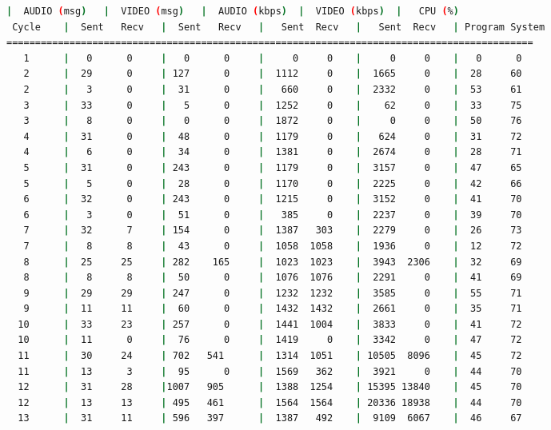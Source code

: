 \begin{adjustbox}{max width=\textwidth}
\begin{lstlisting}[language=bash,basicstyle=\ttfamily\scriptsize]
          |  AUDIO (msg)   |  VIDEO (msg)   |  AUDIO (kbps)  |  VIDEO (kbps)  |   CPU (%)
 Cycle    |  Sent   Recv   |  Sent   Recv   |   Sent  Recv   |   Sent  Recv   | Program System
============================================================================================
   1      |   0      0     |   0      0     |     0     0    |     0     0    |   0      0
   2      |  29      0     | 127      0     |  1112     0    |  1665     0    |  28     60
   2      |   3      0     |  31      0     |   660     0    |  2332     0    |  53     61
   3      |  33      0     |   5      0     |  1252     0    |    62     0    |  33     75
   3      |   8      0     |   0      0     |  1872     0    |     0     0    |  50     76
   4      |  31      0     |  48      0     |  1179     0    |   624     0    |  31     72
   4      |   6      0     |  34      0     |  1381     0    |  2674     0    |  28     71
   5      |  31      0     | 243      0     |  1179     0    |  3157     0    |  47     65
   5      |   5      0     |  28      0     |  1170     0    |  2225     0    |  42     66
   6      |  32      0     | 243      0     |  1215     0    |  3152     0    |  41     70
   6      |   3      0     |  51      0     |   385     0    |  2237     0    |  39     70
   7      |  32      7     | 154      0     |  1387   303    |  2279     0    |  26     73
   7      |   8      8     |  43      0     |  1058  1058    |  1936     0    |  12     72
   8      |  25     25     | 282    165     |  1023  1023    |  3943  2306    |  32     69
   8      |   8      8     |  50      0     |  1076  1076    |  2291     0    |  41     69
   9      |  29     29     | 247      0     |  1232  1232    |  3585     0    |  55     71
   9      |  11     11     |  60      0     |  1432  1432    |  2661     0    |  35     71
  10      |  33     23     | 257      0     |  1441  1004    |  3833     0    |  41     72
  10      |  11      0     |  76      0     |  1419     0    |  3342     0    |  47     72
  11      |  30     24     | 702   541      |  1314  1051    | 10505  8096    |  45     72
  11      |  13      3     |  95      0     |  1569   362    |  3921     0    |  44     70
  12      |  31     28     |1007   905      |  1388  1254    | 15395 13840    |  45     70
  12      |  13     13     | 495   461      |  1564  1564    | 20336 18938    |  44     70
  13      |  31     11     | 596   397      |  1387   492    |  9109  6067    |  46     67

\end{lstlisting}
\end{adjustbox}
